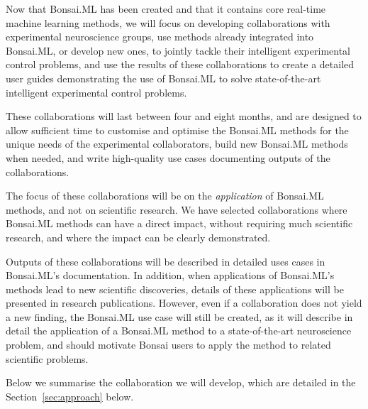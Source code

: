 Now that Bonsai.ML has been created and that it contains core real-time machine
learning methods, we will focus on developing collaborations with experimental
neuroscience groups, use methods already integrated into Bonsai.ML, or develop
new ones, to jointly tackle their intelligent experimental control problems,
and use the results of these collaborations to create a detailed user guides
demonstrating the use of Bonsai.ML to solve state-of-the-art intelligent
experimental control problems.

%
These collaborations will last between four and eight months, and are designed
to allow sufficient time to customise and optimise the Bonsai.ML methods for the
unique needs of the experimental collaborators, build new Bonsai.ML methods when
needed, and write high-quality use cases documenting outputs of the
collaborations.

The focus of these collaborations will be on the \emph{application} of
Bonsai.ML methods, and not on scientific research.
%
We have selected collaborations where Bonsai.ML methods can have a direct impact,
without requiring much scientific research, and where the impact can be clearly
demonstrated.

Outputs of these collaborations will be described in detailed uses cases in
Bonsai.ML's documentation.
%
In addition, when applications of Bonsai.ML's methods lead to new scientific
discoveries, details of these applications will be presented in research
publications.
%
However, even if a collaboration does not yield a new finding, the Bonsai.ML
use case will still be created, as it will describe in detail the application
of a Bonsai.ML method to a state-of-the-art neuroscience problem, and should
motivate Bonsai users to apply the method to related scientific problems.

Below we summarise the collaboration we will develop, which are detailed in the
Section~\ref{sec:approach} below.


